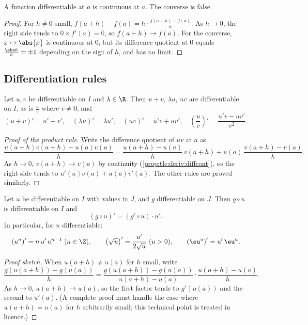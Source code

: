 \begin{proposition}\label{prop:tle:deriv:diffcont}
A function differentiable at $a$ is continuous at $a$. The converse is false.
\end{proposition}

\begin{proof}
For $h \neq 0$ small, $f(a+h) - f(a) = h \cdot \frac{f(a+h)-f(a)}{h}$. As
$h \to 0$, the right side tends to $0 \times f'(a) = 0$, so
$f(a+h) \to f(a)$. For the converse, $x \mapsto \abs{x}$ is continuous at
$0$, but its difference quotient at $0$ equals $\frac{\abs h}{h} = \pm 1$
depending on the sign of $h$, and has no limit.
\end{proof}

\subsection{Differentiation rules}

\begin{proposition}[Operations]\label{prop:tle:deriv:operations}
Let $u, v$ be differentiable on $I$ and $\lambda \in \R$. Then $u + v$,
$\lambda u$, $uv$ are differentiable on $I$, as is $\frac{u}{v}$ where
$v \neq 0$, and
\[
(u+v)' = u' + v', \quad (\lambda u)' = \lambda u', \quad
(uv)' = u'v + uv', \quad
\left(\frac{u}{v}\right)' = \frac{u'v - uv'}{v^2}.
\]
\end{proposition}

\begin{proof}[Proof of the product rule]
Write the difference quotient of $uv$ at $a$ as
\[
\frac{u(a+h)v(a+h) - u(a)v(a)}{h}
= \frac{u(a+h) - u(a)}{h}\,v(a+h) + u(a)\,\frac{v(a+h) - v(a)}{h}.
\]
As $h \to 0$, $v(a+h) \to v(a)$ by continuity
(\cref{prop:tle:deriv:diffcont}), so the right side tends to
$u'(a)v(a) + u(a)v'(a)$. The other rules are proved similarly.
\end{proof}

\begin{theorem}\label{thm:tle:deriv:chain}
Let $u$ be differentiable on $I$ with values in $J$, and $g$ differentiable
on $J$. Then $g \circ u$ is differentiable on $I$ and
\[
(g \circ u)' = (g' \circ u) \cdot u' .
\]
In particular, for $u$ differentiable:
\[
(u^n)' = n\,u'\,u^{n-1} \ (n \in \Z), \qquad
\left(\sqrt{u}\right)' = \frac{u'}{2\sqrt{u}} \ (u > 0), \qquad
\left(\eu^{u}\right)' = u'\,\eu^{u}.
\]
\end{theorem}

\begin{proof}[Proof sketch]
When $u(a+h) \neq u(a)$ for $h$ small, write
\[
\frac{g(u(a+h)) - g(u(a))}{h}
= \frac{g(u(a+h)) - g(u(a))}{u(a+h) - u(a)} \cdot \frac{u(a+h) - u(a)}{h}.
\]
As $h \to 0$, $u(a+h) \to u(a)$, so the first factor tends to $g'(u(a))$ and
the second to $u'(a)$. (A complete proof must handle the case where
$u(a+h) = u(a)$ for $h$ arbitrarily small; this technical point is treated in
licence.)
\end{proof}

